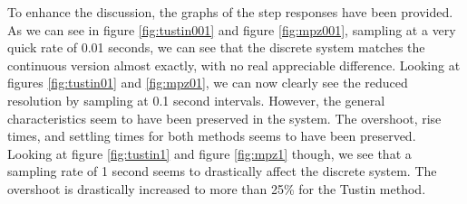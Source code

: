 \documentclass[a4paper, 12pt]{article}
\begin{document}
To enhance the discussion, the graphs of the step responses have been provided.
As we can see in figure \ref{fig:tustin001} and figure \ref{fig:mpz001},
sampling at a very quick rate of 0.01 seconds, we can see that the discrete
system matches the continuous version almost exactly, with no real appreciable
difference. Looking at figures \ref{fig:tustin01} and \ref{fig:mpz01}, we can
now clearly see the reduced resolution by sampling at 0.1 second intervals.
However, the general characteristics seem to have been preserved in the system.
The overshoot, rise times, and settling times for both methods seems to have
been preserved. Looking at figure \ref{fig:tustin1} and figure \ref{fig:mpz1}
though, we see that a sampling rate of 1 second seems to drastically affect the
discrete system. The overshoot is drastically increased to more than 25\% for
the Tustin method.
\end{document}
